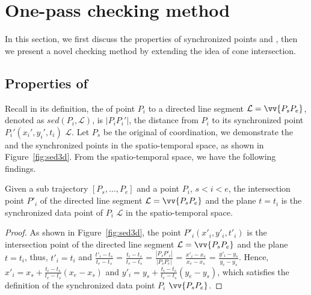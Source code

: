 \section{One-pass \sed checking method}

In this section, we first discuss the properties of synchronized points and \sed, then we present a novel \sed checking method by extending the idea of cone intersection.



\subsection{Properties of \sed} %
Recall in its definition, the \sed of point $P_i$ to a directed line segment $\mathcal{L} = \vv{P_{s}P_{e}}$, denoted as $sed(P_i, \mathcal{L})$, is $|P_iP_i'|$, the distance from $P_i$ to its synchronized point $P_i' (x_i', y_i', t_i)$ \wrt $\mathcal{L}$.
Let $P_s$ be the original of coordination, we demonstrate the \sed and the synchronized points in the spatio-temporal space, as shown in Figure~\ref{fig:sed3d}.
From the spatio-temporal space, we have the following findings.



\begin{lemma}
\label{prop-3d-syn-point}
Given a sub trajectory $[P_s, \ldots, P_e]$ and a point $P_i$, $s<i<e$, the intersection point $P'_i$ of the directed line segment $\mathcal{L} = \vv{P_sP_e}$ and the plane $t=t_i$ is the synchronized data point of $P_i$ \wrt $\mathcal{L}$ in the spatio-temporal space.
\end{lemma}

\begin{proof}
As shown in Figure~\ref{fig:sed3d}, the point $P'_i (x'_i, y'_i, t'_i)$ is the intersection point of the directed line segment $\mathcal{L} = \vv{P_sP_e}$ and the plane $t=t_i$, thus, $t'_i = t_i$ and $\frac{t'_i - t_s}{t_e - t_s}$ = $\frac{t_i - t_s}{t_e - t_s}$  = $\frac{|P_sP'_i|}{|P_sP_e|}$ = $\frac{x'_i - x_s}{x_e - x_s}$ = $\frac{y'_i - y_s}{y_e - y_s}$. Hence, $x'_i = x_s +  \frac{t_i-t_s}{t_e - t_s}(x_e - x_s)$ and $y'_i = y_s +  \frac{t_i - t_s}{t_e - t_s}(y_e - y_s)$, which satisfies the definition of the synchronized data point $P_i$ \wrt $\vv{P_sP_e}$.
\end{proof}

